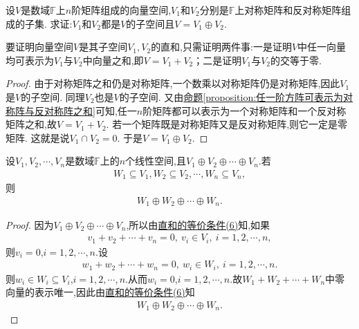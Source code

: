 \documentclass[../../main.tex]{subfiles}%
\begin{document}
\begin{proposition}\label{proposition:矩阵空间可以分解为对称和反称矩阵空间的直和}
设\(V\)是数域\(\mathbb{F}\)上\(n\)阶矩阵组成的向量空间,\(V_1\)和\(V_2\)分别是\(\mathbb{F}\)上对称矩阵和反对称矩阵组成的子集. 求证:\(V_1\)和\(V_2\)都是\(V\)的子空间且\(V = V_1\oplus V_2\).
\end{proposition}
\begin{note}
要证明向量空间\(V\)是其子空间\(V_1,V_2\)的直和,只需证明两件事:一是证明\(V\)中任一向量均可表示为\(V_1\)与\(V_2\)中向量之和,即\(V = V_1 + V_2\)；二是证明\(V_1\)与\(V_2\)的交等于零.
\end{note}
\begin{proof}
由于对称矩阵之和仍是对称矩阵,一个数乘以对称矩阵仍是对称矩阵,因此\(V_1\)是\(V\)的子空间. 同理\(V_2\)也是\(V\)的子空间. 又由\hyperref[proposition:任一阶方阵可表示为对称阵与反对称阵之和]{命题\ref{proposition:任一阶方阵可表示为对称阵与反对称阵之和}}可知,任一\(n\)阶矩阵都可以表示为一个对称矩阵和一个反对称矩阵之和,故\(V = V_1 + V_2\). 若一个矩阵既是对称矩阵又是反对称矩阵,则它一定是零矩阵. 这就是说\(V_1\cap V_2 =0\). 于是\(V = V_1\oplus V_2\). 
\end{proof}

\begin{proposition}\label{proposition:直和分解的每个子空间的和还是直和}
设$V_1,V_2,\cdots,V_n$是数域$\mathbb{F}$上的$n$个线性空间,且$V_1\oplus V_2\oplus \cdots \oplus V_n$.若
\begin{align*}
W_1\subseteq V_1,W_2\subseteq V_2,\cdots ,W_n\subseteq V_n,
\end{align*}
则
\begin{align*}
W_1\oplus W_2\oplus \cdots \oplus W_n.
\end{align*}
\end{proposition}
\begin{proof}
因为$V_1\oplus V_2\oplus \cdots \oplus V_n$,所以由\hyperref[theorem:直和的等价条件]{直和的等价条件(6)}知,如果
\begin{align*}
v_1+v_2+\cdots +v_n=0,\ v_i\in V_i,\ i=1,2,\cdots,n,
\end{align*}
则$v_i=0$,$i=1,2,\cdots,n$.设
\begin{align*}
w_1+w_2+\cdots +w_n=0,\ w_i\in W_i,\ i=1,2,\cdots,n.
\end{align*}
则$w_i\in W_i\subseteq V_i$,$i=1,2,\cdots,n$.从而$w_i=0$,$i=1,2,\cdots,n$.故$W_1+W_2+\cdots +W_n$中零向量的表示唯一,因此由\hyperref[theorem:直和的等价条件]{直和的等价条件(6)}知
\begin{align*}
W_1\oplus W_2\oplus \cdots \oplus W_n.
\end{align*}
\end{proof}
\end{document}
